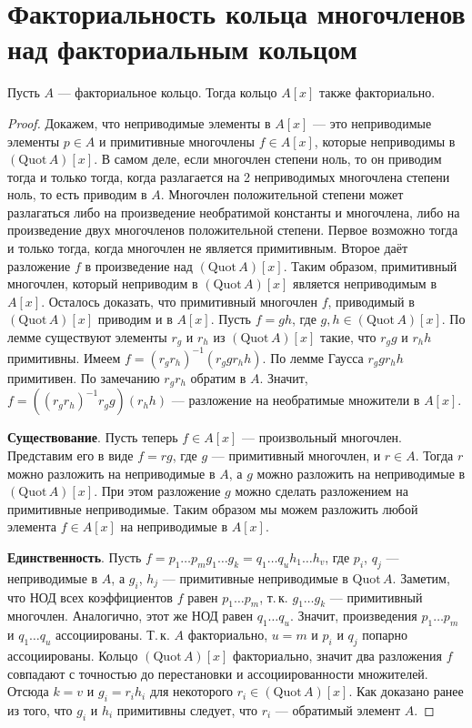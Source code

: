 \section{Факториальность кольца многочленов над факториальным кольцом}

\begin{theorem}
    Пусть $A$ --- факториальное кольцо. Тогда кольцо $A[x]$ также факториально.
\end{theorem}

\begin{proof}
    Докажем, что неприводимые элементы в $A[x]$ --- это неприводимые элементы $p \in A$ и примитивные многочлены $f \in A[x]$, которые неприводимы в $(\mathrm{Quot}\,A)[x]$. В самом деле, если многочлен степени ноль, то он приводим тогда и только тогда, когда разлагается на 2 неприводимых многочлена степени ноль, то есть приводим в $A$. Многочлен положительной степени может разлагаться либо на произведение необратимой константы и многочлена, либо на произведение двух многочленов положительной степени. Первое возможно тогда и только тогда, когда многочлен не является примитивным. Второе даёт разложение $f$ в произведение над $(\mathrm{Quot}\,A)[x]$. Таким образом, примитивный многочлен, который неприводим в $(\mathrm{Quot}\,A)[x]$ является неприводимым в $A[x]$. Осталось доказать, что примитивный многочлен $f$, приводимый в $(\mathrm{Quot}\,A)[x]$ приводим и в $A[x]$. Пусть $f = gh$, где $g, h \in (\mathrm{Quot}\,A)[x]$. По лемме существуют элементы $r_g$ и $r_h$ из $(\mathrm{Quot}\,A)[x]$ такие, что $r_gg$ и $r_hh$ примитивны. Имеем $f = (r_gr_h)^{-1}(r_ggr_hh)$. По лемме Гаусса $r_ggr_hh$ примитивен. По замечанию $r_gr_h$ обратим в $A$. Значит, $f = ((r_gr_h)^{-1}r_gg)(r_hh)$ --- разложение на необратимые множители в $A[x]$.

    \textbf{Существование}. Пусть теперь $f \in A[x]$ --- произвольный многочлен. Представим его в виде $f = rg$, где $g$ --- примитивный многочлен, и $r \in A$. Тогда $r$ можно разложить на неприводимые в $A$, а $g$ можно разложить на неприводимые в $(\mathrm{Quot}\,A)[x]$. При этом разложение $g$ можно сделать разложением на примитивные неприводимые. Таким образом мы можем разложить любой элемента $f \in A[x]$ на неприводимые в $A[x]$.

    \textbf{Единственность}. Пусть $f = p_1\ldots p_m g_1\ldots g_k = q_1\ldots q_u h_1\ldots h_v$, где $p_i$, $q_j$ --- неприводимые в $A$, а $g_i$, $h_j$ --- примитивные неприводимые в $\mathrm{Quot}\,A$. Заметим, что НОД всех коэффициентов $f$ равен $p_1\ldots p_m$, т.\,к. $g_1\ldots g_k$ --- примитивный многочлен. Аналогично, этот же НОД равен $q_1\ldots q_u$. Значит, произведения $p_1\ldots p_m$ и $q_1\ldots q_u$ ассоциированы. Т.\,к. $A$ факториально, $u = m$ и $p_i$ и $q_j$ попарно ассоциированы. Кольцо $(\mathrm{Quot}\,A)[x]$ факториально, значит два разложения $f$ совпадают с точностью до перестановки и ассоциированности множителей. Отсюда $k = v$ и $g_i = r_ih_i$ для некоторого $r_i \in (\mathrm{Quot}\,A)[x]$. Как доказано ранее из того, что $g_i$ и $h_i$ примитивны следует, что $r_i$ --- обратимый элемент $A$.
\end{proof}

